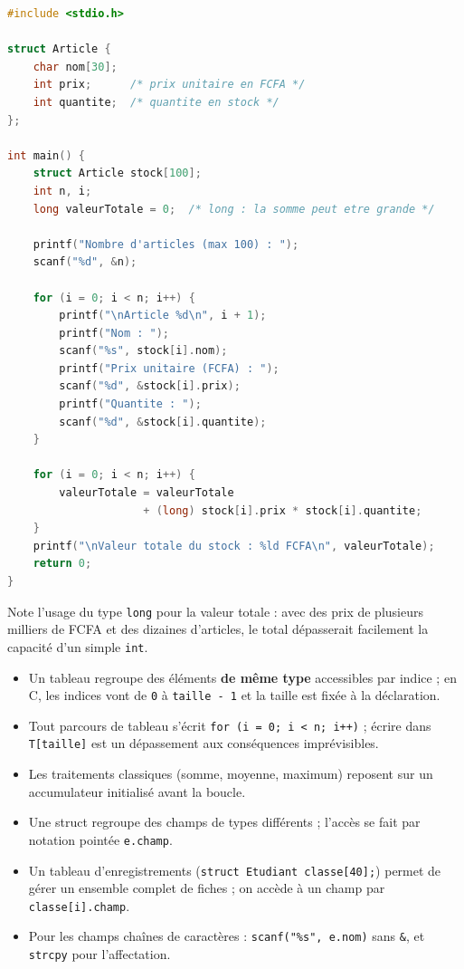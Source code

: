 \documentclass[11pt]{article}
\newcommand{\cle}[1]{{\popxbold\color{popdark}#1}}
\begin{document}
\begin{corrige}
\begin{lstlisting}[language=C]
#include <stdio.h>

struct Article {
    char nom[30];
    int prix;      /* prix unitaire en FCFA */
    int quantite;  /* quantite en stock */
};

int main() {
    struct Article stock[100];
    int n, i;
    long valeurTotale = 0;  /* long : la somme peut etre grande */

    printf("Nombre d'articles (max 100) : ");
    scanf("%d", &n);

    for (i = 0; i < n; i++) {
        printf("\nArticle %d\n", i + 1);
        printf("Nom : ");
        scanf("%s", stock[i].nom);
        printf("Prix unitaire (FCFA) : ");
        scanf("%d", &stock[i].prix);
        printf("Quantite : ");
        scanf("%d", &stock[i].quantite);
    }

    for (i = 0; i < n; i++) {
        valeurTotale = valeurTotale
                     + (long) stock[i].prix * stock[i].quantite;
    }
    printf("\nValeur totale du stock : %ld FCFA\n", valeurTotale);
    return 0;
}
\end{lstlisting}
Note l'usage du type \texttt{long} pour la valeur totale : avec des prix de plusieurs milliers de FCFA et des dizaines d'articles, le total dépasserait facilement la capacité d'un simple \texttt{int}.
\end{corrige}

\begin{aretenir}
\begin{itemize}
\item Un \cle{tableau} regroupe des éléments \textbf{de même type} accessibles par indice ; en C, les indices vont de \texttt{0} à \texttt{taille - 1} et la taille est fixée à la déclaration.
\item Tout parcours de tableau s'écrit \texttt{for (i = 0; i < n; i++)} ; écrire dans \texttt{T[taille]} est un dépassement aux conséquences imprévisibles.
\item Les traitements classiques (somme, moyenne, maximum) reposent sur un accumulateur initialisé avant la boucle.
\item Une \cle{struct} regroupe des champs de types différents ; l'accès se fait par notation pointée \texttt{e.champ}.
\item Un tableau d'enregistrements (\texttt{struct Etudiant classe[40];}) permet de gérer un ensemble complet de fiches ; on accède à un champ par \texttt{classe[i].champ}.
\item Pour les champs chaînes de caractères : \texttt{scanf("\%s", e.nom)} sans \texttt{\&}, et \texttt{strcpy} pour l'affectation.
\end{itemize}
\end{aretenir}
\end{document}
